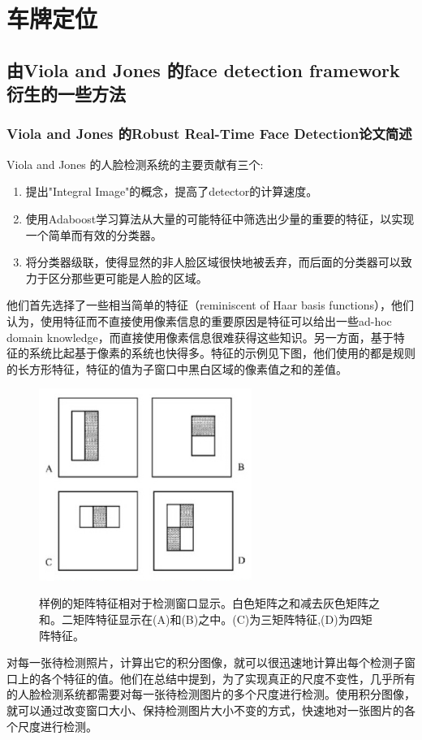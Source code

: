 \section{车牌定位}
\subsection{由Viola and Jones 的face detection framework 衍生的一些方法}
\subsubsection{Viola and Jones 的Robust Real-Time Face Detection论文简述}
Viola and Jones 的人脸检测系统的主要贡献有三个:
\begin{enumerate}
\item
提出"Integral Image"的概念，提高了detector的计算速度。
\item
使用Adaboost学习算法从大量的可能特征中筛选出少量的重要的特征，以实现一个简单而有效的分类器。
\item
将分类器级联，使得显然的非人脸区域很快地被丢弃，而后面的分类器可以致力于区分那些更可能是人脸的区域。
\end{enumerate}
他们首先选择了一些相当简单的特征（reminiscent of Haar basis functions），他们认为，使用特征而不直接使用像素信息的重要原因是特征可以给出一些ad-hoc domain knowledge，而直接使用像素信息很难获得这些知识。另一方面，基于特征的系统比起基于像素的系统也快得多。特征的示例见下图，他们使用的都是规则的长方形特征，特征的值为子窗口中黑白区域的像素值之和的差值。
\begin{figure}[H]
    \centering 
    \includegraphics[width=0.618\textwidth]{image/2_1_1_1.jpg}    
    \label{logic}
    \caption{
    样例的矩阵特征相对于检测窗口显示。白色矩阵之和减去灰色矩阵之和。二矩阵特征显示在(A)和(B)之中。(C)为三矩阵特征,(D)为四矩阵特征。
    }
\end{figure}
对每一张待检测照片，计算出它的积分图像，就可以很迅速地计算出每个检测子窗口上的各个特征的值。他们在总结中提到，为了实现真正的尺度不变性，几乎所有的人脸检测系统都需要对每一张待检测图片的多个尺度进行检测。使用积分图像，就可以通过改变窗口大小、保持检测图片大小不变的方式，快速地对一张图片的各个尺度进行检测。

